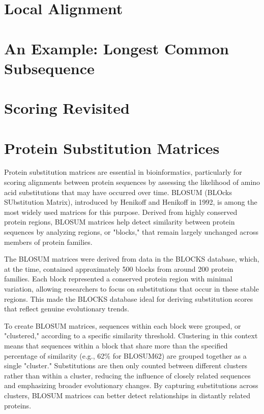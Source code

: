 \section{Local Alignment}

\section{An Example: Longest Common Subsequence}

\section{Scoring Revisited}

\section{Protein Substitution Matrices}

Protein substitution matrices are essential in bioinformatics, particularly for scoring alignments between protein sequences by assessing the likelihood of amino acid substitutions that may have occurred over time. BLOSUM (BLOcks SUbstitution Matrix), introduced by Henikoff and Henikoff in 1992, is among the most widely used matrices for this purpose. Derived from highly conserved protein regions, BLOSUM matrices help detect similarity between protein sequences by analyzing regions, or "blocks," that remain largely unchanged across members of protein families.

The BLOSUM matrices
were derived from data in the BLOCKS database, which, at the time, contained approximately 500 blocks from around 200 protein families. Each block represented a conserved protein region with minimal variation, allowing researchers to focus on substitutions that occur in these stable regions. This made the BLOCKS database ideal for deriving substitution scores that reflect genuine evolutionary trends.

To create BLOSUM matrices, sequences within each block were grouped, or "clustered," according to a specific similarity threshold. Clustering in this context means that sequences within a block that share more than the specified percentage of similarity (e.g., 62\% for BLOSUM62) are grouped together as a single "cluster." Substitutions are then only counted between different clusters rather than within a cluster, reducing the influence of closely related sequences and emphasizing broader evolutionary changes. By capturing substitutions across clusters, BLOSUM matrices can better detect relationships in distantly related proteins.


